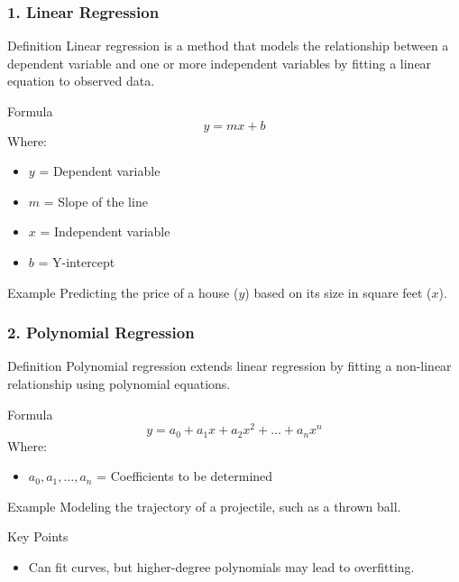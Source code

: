 \documentclass[aspectratio=169]{beamer}
\begin{document}
\begin{frame}[fragile]
    \frametitle{1. Linear Regression}
    \begin{block}{Definition}
        Linear regression is a method that models the relationship between a dependent variable and one or more independent variables by fitting a linear equation to observed data.
    \end{block}
    
    \begin{block}{Formula}
        \begin{equation}
            y = mx + b 
        \end{equation}
        Where:
        \begin{itemize}
            \item \( y \) = Dependent variable
            \item \( m \) = Slope of the line
            \item \( x \) = Independent variable
            \item \( b \) = Y-intercept
        \end{itemize}
    \end{block}
    
    \begin{block}{Example}
        Predicting the price of a house (\(y\)) based on its size in square feet (\(x\)).
    \end{block}
\end{frame}

\begin{frame}[fragile]
    \frametitle{2. Polynomial Regression}
    \begin{block}{Definition}
        Polynomial regression extends linear regression by fitting a non-linear relationship using polynomial equations.
    \end{block}
    
    \begin{block}{Formula}
        \begin{equation}
            y = a_0 + a_1x + a_2x^2 + ... + a_nx^n 
        \end{equation}
        Where:
        \begin{itemize}
            \item \( a_0, a_1, \dots, a_n \) = Coefficients to be determined
        \end{itemize}
    \end{block}

    \begin{block}{Example}
        Modeling the trajectory of a projectile, such as a thrown ball.
    \end{block}
    
    \begin{block}{Key Points}
        \begin{itemize}
            \item Can fit curves, but higher-degree polynomials may lead to overfitting.
        \end{itemize}
    \end{block}
\end{frame}
\end{document}

